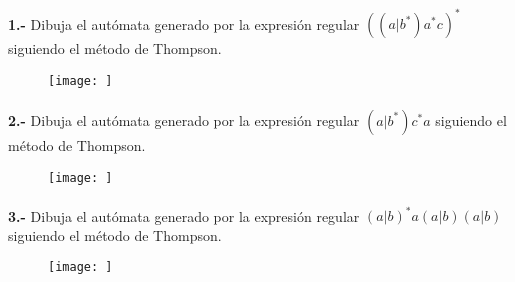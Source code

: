 \documentclass[11pt,a4paper]{report}
\begin{document}
\paragraph{}

\paragraph{}
\textbf{1.-} Dibuja el autómata generado por la expresión regular $ ((a|b^*)a^*c)^* $ siguiendo el método de Thompson.
\begin{figure}[ht!]
\centering
\texttt{[image: ]}
\end{figure}\paragraph{}
\textbf{2.-} Dibuja el autómata generado por la expresión regular $ (a|b^*)c^*a $ siguiendo el método de Thompson.
\begin{figure}[ht!]
\centering
\texttt{[image: ]}
\end{figure}\paragraph{}
\textbf{3.-} Dibuja el autómata generado por la expresión regular $ (a|b)^*a(a|b)(a|b) $ siguiendo el método de Thompson.
\begin{figure}[ht!]
\centering
\texttt{[image: ]}
\end{figure}
\end{document}
